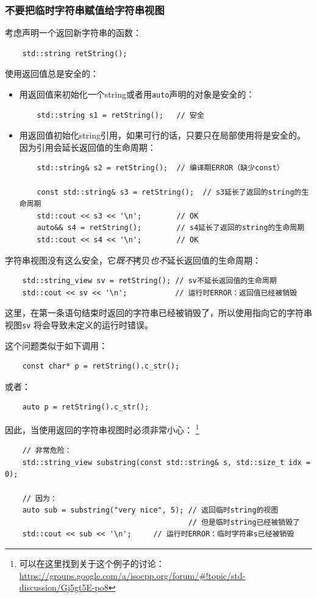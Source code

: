 \subsubsection{不要把临时字符串赋值给字符串视图}
考虑声明一个返回新字符串的函数：
\begin{lstlisting}
    std::string retString();
\end{lstlisting}
使用返回值总是安全的：
\begin{itemize}
    \item 用返回值来初始化一个string或者用\texttt{auto}声明的对象是安全的：
    \begin{lstlisting}
    std::string s1 = retString();   // 安全
    \end{lstlisting}
    \item 用返回值初始化string引用，如果可行的话，只要只在局部使用将是安全的。
    因为引用会延长返回值的生命周期：
    \begin{lstlisting}
    std::string& s2 = retString();  // 编译期ERROR（缺少const）

    const std::string& s3 = retString();  // s3延长了返回的string的生命周期
    std::cout << s3 << '\n';        // OK
    auto&& s4 = retString();        // s4延长了返回的string的生命周期
    std::cout << s4 << '\n';        // OK
    \end{lstlisting}
\end{itemize}
字符串视图没有这么安全，它\emph{既不}拷贝\emph{也不}延长返回值的生命周期：
\begin{lstlisting}
    std::string_view sv = retString(); // sv不延长返回值的生命周期
    std::cout << sv << '\n';           // 运行时ERROR：返回值已经被销毁
\end{lstlisting}
这里，在第一条语句结束时返回的字符串已经被销毁了，所以使用指向它的字符串视图\texttt{sv}
将会导致未定义的运行时错误。

这个问题类似于如下调用：
\begin{lstlisting}
    const char* p = retString().c_str();
\end{lstlisting}
或者：
\begin{lstlisting}
    auto p = retString().c_str();
\end{lstlisting}
因此，当使用返回的字符串视图时必须非常小心：
\footnote{可以在这里找到关于这个例子的讨论：
\url{https://groups.google.com/a/isocpp.org/forum/\#!topic/std-discussion/Gj5gt5E-po8}}
\begin{lstlisting}
    // 非常危险：
    std::string_view substring(const std::string& s, std::size_t idx = 0);

    // 因为：
    auto sub = substring("very nice", 5); // 返回临时string的视图
                                          // 但是临时string已经被销毁了
    std::cout << sub << '\n';     // 运行时ERROR：临时字符串s已经被销毁
\end{lstlisting}

